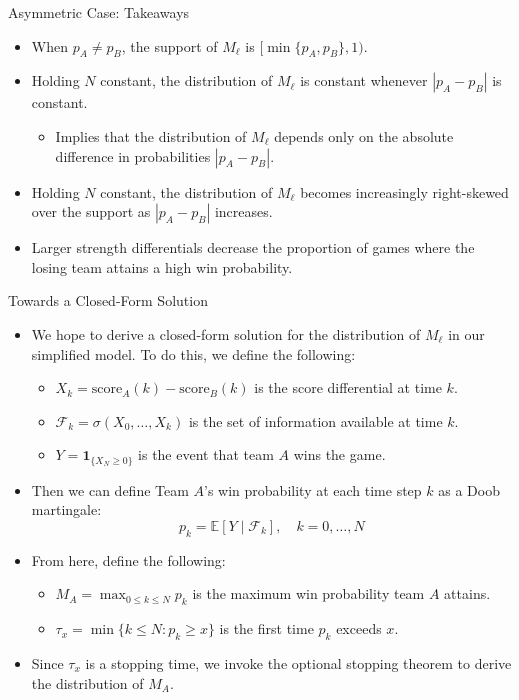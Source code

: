 \documentclass{beamer}
\begin{document}
\begin{frame}{Asymmetric Case: Takeaways}
  \begin{itemize}
    \item When $p_A \neq p_B$, the support of $M_\ell$ is $[\min\{p_A, p_B\}, 1)$.
    \pause
    \item Holding $N$ constant, the distribution of $M_\ell$ is constant whenever $|p_A - p_B|$ is constant.
    \pause
    \begin{itemize}
      \item Implies that the distribution of $M_\ell$ depends only on the absolute difference in probabilities $|p_A - p_B|$.
    \end{itemize}
    \pause
    \item Holding $N$ constant, the distribution of $M_\ell$ becomes increasingly right-skewed over the support as $|p_A - p_B|$ increases.
    \pause
    \item Larger strength differentials decrease the proportion of games where the losing team attains a high win probability.
  \end{itemize}
\end{frame}


\begin{frame}{Towards a Closed-Form Solution}
  \begin{itemize}
    \item We hope to derive a closed-form solution for the distribution of $M_\ell$ in our simplified model. To do this, we define the following:
    \pause
    \begin{itemize}
      \item $X_k = \text{score}_A(k) - \text{score}_B(k)$ is the score differential at time $k$.
      \pause
      \item $\mathcal{F}_k = \sigma(X_0, \ldots, X_k)$ is the set of information available at time $k$.
      \pause
      \item $Y = \boldsymbol{1}_{\{X_N \geq 0\}}$ is the event that team $A$ wins the game.
    \end{itemize}
    \pause
    \item Then we can define Team $A$'s win probability at each time step $k$ as a Doob martingale:
    \begin{equation*}
      p_k = \mathbb{E}[Y \mid \mathcal{F}_k], \quad k = 0, \ldots, N
    \end{equation*}
    \pause
    \item From here, define the following:
    \pause
    \begin{itemize}
      \item $M_A = \max_{0 \leq k \leq N} p_k$ is the maximum win probability team $A$ attains.
      \pause
      \item $\tau_x = \min\{k \leq N : p_k \geq x\}$ is the first time $p_k$ exceeds $x$.
    \end{itemize}
    \pause
    \item Since $\tau_x$ is a stopping time, we invoke the optional stopping theorem to derive the distribution of $M_A$.
  \end{itemize}
\end{frame}
\end{document}

